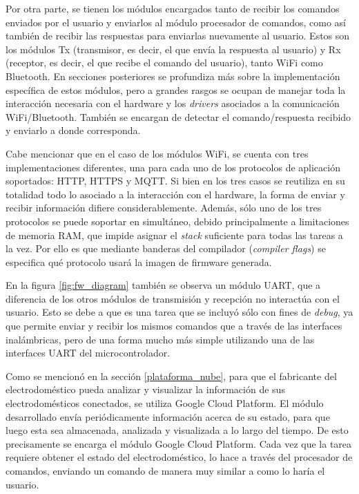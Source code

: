 Por otra parte, se tienen los módulos encargados tanto de recibir los comandos enviados por el usuario y enviarlos al módulo procesador de comandos, como así también de recibir las respuestas para enviarlas nuevamente al usuario. Estos son los módulos Tx (transmisor, es decir, el que envía la respuesta al usuario) y Rx (receptor, es decir, el que recibe el comando del usuario), tanto WiFi como Bluetooth. En secciones posteriores se profundiza más sobre la implementación específica de estos módulos, pero a grandes rasgos se ocupan de manejar toda la interacción necesaria con el hardware y los \emph{drivers} asociados a la comunicación WiFi/Bluetooth. También se encargan de detectar el comando/respuesta recibido y enviarlo a donde corresponda. 

Cabe mencionar que en el caso de los módulos WiFi, se cuenta con tres implementaciones diferentes, una para cada uno de los protocolos de aplicación soportados: HTTP, HTTPS y MQTT. Si bien en los tres casos se reutiliza en su totalidad todo lo asociado a la interacción con el hardware, la forma de enviar y recibir información difiere considerablemente. Además, sólo uno de los tres protocolos se puede soportar en simultáneo, debido principalmente a limitaciones de memoria RAM, que impide asignar el \emph{stack} suficiente para todas las tareas a la vez. Por ello es que mediante banderas del compilador (\emph{compiler flags}) se especifica qué protocolo usará la imagen de firmware generada.

En la figura \ref{fig:fw_diagram} también se observa un módulo UART, que a diferencia de los otros módulos de transmisión y recepción no interactúa con el usuario. Esto se debe a que es una tarea que se incluyó sólo con fines de \emph{debug}, ya que permite enviar y recibir los mismos comandos que a través de las interfaces inalámbricas, pero de una forma mucho más simple utilizando una de las interfaces UART del microcontrolador.

Como se mencionó en la sección \ref{plataforma_nube}, para que el fabricante del electrodoméstico pueda analizar y visualizar la información de sus electrodomésticos conectados, se utiliza Google Cloud Platform. El módulo desarrollado envía periódicamente información acerca de su estado, para que luego esta sea almacenada, analizada y visualizada a lo largo del tiempo. De esto precisamente se encarga el módulo Google Cloud Platform. Cada vez que la tarea requiere obtener el estado del electrodoméstico, lo hace a través del procesador de comandos, enviando un comando de manera muy similar a como lo haría el usuario.

